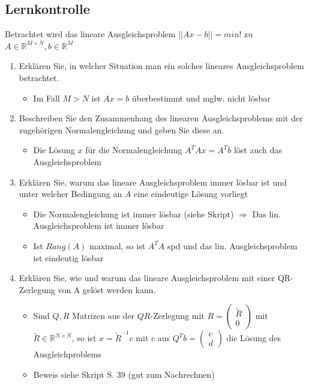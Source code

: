 \documentclass[]{article}
\begin{document}
\subsection{Lernkontrolle}
	Betrachtet wird das lineare Ausgleichsproblem $||Ax-b|| = min!$ zu $A \in \mathbb{R}^{M \times N}, b \in \mathbb{R}^M$
	\begin{enumerate}
		\item Erklären Sie, in welcher Situation man ein solches lineares Ausgleichsproblem betrachtet.
			\begin{itemize}
				\item Im Fall $M > N$ ist $Ax=b$ überbestimmt und mglw. nicht lösbar
			\end{itemize}
		\item Beschreiben Sie den Zusammenhang des linearen Ausgleichsproblems mit der zugehörigen Normalengleichung und geben Sie diese an.
			\begin{itemize}
				\item Die Lösung $x$ für die Normalengleichung $A^TAx = A^Tb$ löst auch das Ausgleichsproblem
			\end{itemize}
		\item Erklären Sie, warum das lineare Ausgleichsproblem immer lösbar ist und unter welcher Bedingung an $A$ eine eindeutige Lösung vorliegt
			\begin{itemize}
				\item Die Normalengleichung ist immer lösbar (siehe Skript) $\Rightarrow$ Das lin. Ausgleichsproblem ist immer lösbar
				\item Ist $Rang(A)$ maximal, so ist $A^TA$ spd und das lin. Ausgleichsproblem ist eindeutig lösbar
			\end{itemize}
		\item Erklären Sie, wie und warum das lineare Ausgleichsproblem mit einer QR-Zerlegung von A gelöst werden kann.
			\begin{itemize}
				\item Sind $Q, R$ Matrizen aus der $QR$-Zerlegung mit $R = \left (\begin{array}{r} \tilde{R} \\ 0 \end{array} \right)$ mit $\tilde{R} \in \mathbb{R}^{N \times N}$, so ist $x = \tilde{R}^{-1} c$ mit $c$ aus $Q^Tb = \left (\begin{array}{r} c \\ d \end{array} \right)$ die Lösung des Ausgleichproblems
				\item Beweis siehe Skript S. 39 (gut zum Nachrechnen)

\end{itemize}
\end{enumerate}
\end{document}
